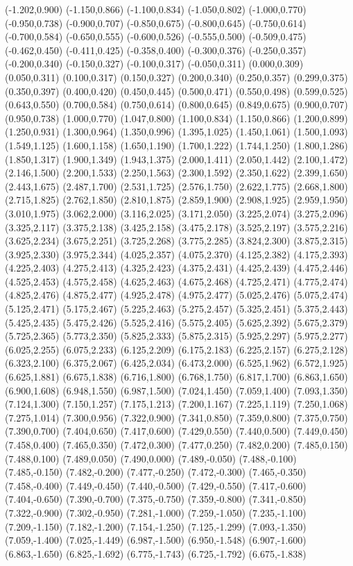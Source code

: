 (-1.202,0.900) (-1.150,0.866) (-1.100,0.834) (-1.050,0.802) (-1.000,0.770) (-0.950,0.738) (-0.900,0.707) (-0.850,0.675) (-0.800,0.645) (-0.750,0.614) (-0.700,0.584) (-0.650,0.555) (-0.600,0.526) (-0.555,0.500) (-0.509,0.475) (-0.462,0.450) (-0.411,0.425) (-0.358,0.400) (-0.300,0.376) (-0.250,0.357) (-0.200,0.340) (-0.150,0.327) (-0.100,0.317) (-0.050,0.311) (0.000,0.309) (0.050,0.311) (0.100,0.317) (0.150,0.327) (0.200,0.340) (0.250,0.357) (0.299,0.375) (0.350,0.397) (0.400,0.420) (0.450,0.445) (0.500,0.471) (0.550,0.498) (0.599,0.525) (0.643,0.550) (0.700,0.584) (0.750,0.614) (0.800,0.645) (0.849,0.675) (0.900,0.707) (0.950,0.738) (1.000,0.770) (1.047,0.800) (1.100,0.834) (1.150,0.866) (1.200,0.899) (1.250,0.931) (1.300,0.964) (1.350,0.996) (1.395,1.025) (1.450,1.061) (1.500,1.093) (1.549,1.125) (1.600,1.158) (1.650,1.190) (1.700,1.222) (1.744,1.250) (1.800,1.286) (1.850,1.317) (1.900,1.349) (1.943,1.375) (2.000,1.411) (2.050,1.442) (2.100,1.472) (2.146,1.500) (2.200,1.533) (2.250,1.563) (2.300,1.592) (2.350,1.622) (2.399,1.650) (2.443,1.675) (2.487,1.700) (2.531,1.725) (2.576,1.750) (2.622,1.775) (2.668,1.800) (2.715,1.825) (2.762,1.850) (2.810,1.875) (2.859,1.900) (2.908,1.925) (2.959,1.950) (3.010,1.975) (3.062,2.000) (3.116,2.025) (3.171,2.050) (3.225,2.074) (3.275,2.096) (3.325,2.117) (3.375,2.138) (3.425,2.158) (3.475,2.178) (3.525,2.197) (3.575,2.216) (3.625,2.234) (3.675,2.251) (3.725,2.268) (3.775,2.285) (3.824,2.300) (3.875,2.315) (3.925,2.330) (3.975,2.344) (4.025,2.357) (4.075,2.370) (4.125,2.382) (4.175,2.393) (4.225,2.403) (4.275,2.413) (4.325,2.423) (4.375,2.431) (4.425,2.439) (4.475,2.446) (4.525,2.453) (4.575,2.458) (4.625,2.463) (4.675,2.468) (4.725,2.471) (4.775,2.474) (4.825,2.476) (4.875,2.477) (4.925,2.478) (4.975,2.477) (5.025,2.476) (5.075,2.474) (5.125,2.471) (5.175,2.467) (5.225,2.463) (5.275,2.457) (5.325,2.451) (5.375,2.443) (5.425,2.435) (5.475,2.426) (5.525,2.416) (5.575,2.405) (5.625,2.392) (5.675,2.379) (5.725,2.365) (5.773,2.350) (5.825,2.333) (5.875,2.315) (5.925,2.297) (5.975,2.277) (6.025,2.255) (6.075,2.233) (6.125,2.209) (6.175,2.183) (6.225,2.157) (6.275,2.128) (6.323,2.100) (6.375,2.067) (6.425,2.034) (6.473,2.000) (6.525,1.962) (6.572,1.925) (6.625,1.881) (6.675,1.838) (6.716,1.800) (6.768,1.750) (6.817,1.700) (6.863,1.650) (6.900,1.608) (6.948,1.550) (6.987,1.500) (7.024,1.450) (7.059,1.400) (7.093,1.350) (7.124,1.300) (7.150,1.257) (7.175,1.213) (7.200,1.167) (7.225,1.119) (7.250,1.068) (7.275,1.014) (7.300,0.956) (7.322,0.900) (7.341,0.850) (7.359,0.800) (7.375,0.750) (7.390,0.700) (7.404,0.650) (7.417,0.600) (7.429,0.550) (7.440,0.500) (7.449,0.450) (7.458,0.400) (7.465,0.350) (7.472,0.300) (7.477,0.250) (7.482,0.200) (7.485,0.150) (7.488,0.100) (7.489,0.050) (7.490,0.000) (7.489,-0.050) (7.488,-0.100) (7.485,-0.150) (7.482,-0.200) (7.477,-0.250) (7.472,-0.300) (7.465,-0.350) (7.458,-0.400) (7.449,-0.450) (7.440,-0.500) (7.429,-0.550) (7.417,-0.600) (7.404,-0.650) (7.390,-0.700) (7.375,-0.750) (7.359,-0.800) (7.341,-0.850) (7.322,-0.900) (7.302,-0.950) (7.281,-1.000) (7.259,-1.050) (7.235,-1.100) (7.209,-1.150) (7.182,-1.200) (7.154,-1.250) (7.125,-1.299) (7.093,-1.350) (7.059,-1.400) (7.025,-1.449) (6.987,-1.500) (6.950,-1.548) (6.907,-1.600) (6.863,-1.650) (6.825,-1.692) (6.775,-1.743) (6.725,-1.792) (6.675,-1.838) 